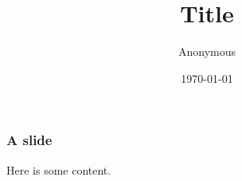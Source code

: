 \documentclass{beamer}
\title{Title}
\author{Anonymous}
\date{\today}
\begin{document}
\frame{\titlepage}

\begin{frame}
\frametitle{A slide}
Here is some content.
\end{frame}
\end{document}
